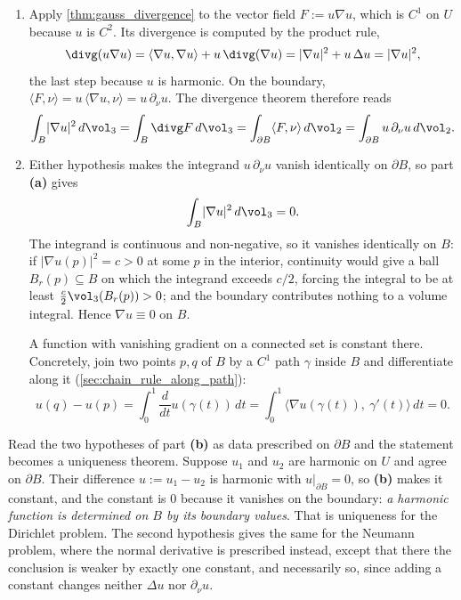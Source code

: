 \begin{exercisesolution}
\label{sol:green_first_identity_harmonic}
\begin{enumerate}[label=\textbf{(\alph*)}]
  \item Apply \cref{thm:gauss_divergence} to the vector field $F := u\nabla u$, which is $C^1$ on
    $U$ because $u$ is $C^2$. Its divergence is computed by the product rule,
    \[\divg(u\nabla u) = \langle\nabla u,\nabla u\rangle + u\,\divg(\nabla u)
      = \lvert\nabla u\rvert^2 + u\,\Delta u = \lvert\nabla u\rvert^2 ,\]
    the last step because $u$ is harmonic. On the boundary,
    $\langle F,\nu\rangle = u\,\langle\nabla u,\nu\rangle = u\,\partial_\nu u$. The divergence
    theorem therefore reads
    \[\int_B \lvert\nabla u\rvert^2 \,d\vol_3 = \int_B \divg F\,d\vol_3
      = \int_{\partial B}\langle F,\nu\rangle\,d\vol_2
      = \int_{\partial B} u\,\partial_\nu u \,d\vol_2 .\]
  \item Either hypothesis makes the integrand $u\,\partial_\nu u$ vanish identically on
    $\partial B$, so part \textbf{(a)} gives
    \[\int_B \lvert\nabla u\rvert^2 \,d\vol_3 = 0 .\]
    The integrand is continuous and non-negative, so it vanishes identically on $B$: if
    $\lvert\nabla u(p)\rvert^2 = c > 0$ at some $p$ in the interior, continuity would give a ball
    $B_r(p) \subseteq B$ on which the integrand exceeds $c/2$, forcing the integral to be at
    least $\tfrac{c}{2}\vol_3(B_r(p)) > 0$; and the boundary contributes nothing to a volume
    integral. Hence $\nabla u \equiv 0$ on $B$.

    A function with vanishing gradient on a connected set is constant there. Concretely, join two
    points $p,q$ of $B$ by a $C^1$ path $\gamma$ inside $B$ and differentiate along it
    (\cref{sec:chain_rule_along_path}):
    \[u(q) - u(p) = \int_0^1 \frac{d}{dt}u(\gamma(t))\,dt
      = \int_0^1 \big\langle \nabla u(\gamma(t)),\ \gamma'(t)\big\rangle\,dt = 0 .\]
\end{enumerate}

\begin{remark}
Read the two hypotheses of part \textbf{(b)} as data prescribed on $\partial B$ and the statement
becomes a uniqueness theorem. Suppose $u_1$ and $u_2$ are harmonic on $U$ and agree on
$\partial B$. Their difference $u := u_1 - u_2$ is harmonic with $u|_{\partial B} = 0$, so
\textbf{(b)} makes it constant, and the constant is $0$ because it vanishes on the boundary:
\emph{a harmonic function is determined on $B$ by its boundary values}. That is uniqueness for
the Dirichlet problem. The second hypothesis gives the same for the Neumann problem, where the
normal derivative is prescribed instead, except that there the conclusion is weaker by exactly
one constant, and necessarily so, since adding a constant changes neither $\Delta u$ nor
$\partial_\nu u$.


\end{remark}
\end{exercisesolution}
